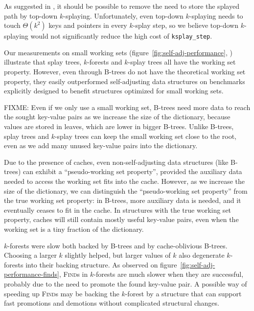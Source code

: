 As suggested in \cite{ksplay-sherk}, it should be possible to remove the
need to store the splayed path by top-down \mbox{$k$-splaying}.
Unfortunately, even top-down \mbox{$k$-splaying} needs to touch
$\Theta(k^2)$ keys and pointers in every $k$-splay step, so we believe top-down
\mbox{$k$-splaying} would not significantly reduce the high cost of
\texttt{ksplay\_step}.

Our measurements on small working sets
(figure~\ref{fig:self-adj-performance},
) illustrate that splay trees, $k$-forests
and $k$-splay trees all have the working set property.
However, even through \mbox{B-trees} do not have the theoretical working set
property, they easily outperformed self-adjusting data structures on
benchmarks explicitly designed to benefit structures optimized for small
working sets.

FIXME:
Even if we only use a small working set, B-trees need more data to reach
the sought key-value pairs as we increase the size of the dictionary, because
values are stored in leaves, which are lower in bigger B-trees.
Unlike B-trees, splay trees and $k$-splay trees can keep the small working set
close to the root, even as we add many unused key-value pairs into the
dictionary.

Due to the presence of caches, even non-self-adjusting data structures (like
\mbox{B-trees}) can exhibit a ``pseudo-working set property'', provided
the auxiliary data needed to access the working set fits into the cache.
However, as we increase the size of the dictionary, we can distinguish
the ``pseudo-working set property'' from the true working set property:
in B-trees, more auxiliary data is needed, and it eventually ceases to fit
in the cache.
In structures with the true working set property, caches will still contain
mostly useful key-value pairs, even when the working set is a tiny fraction
of the dictionary.

$k$-forests were slow both backed by B-trees and by cache-oblivious B-trees.
Choosing a larger $k$ slightly helped, but larger values of $k$ also degenerate
\mbox{$k$-forests} into their backing structure.
As observed on figure~\ref{fig:self-adj-performance-finds}, \textsc{Find}s in
$k$-forests are much slower when they are successful, probably due to the need
to promote the found key-value pair. A possible way of speeding up
\textsc{Find}s may be backing the \mbox{$k$-forest} by a structure that can
support fast promotions and demotions without complicated structural changes.

